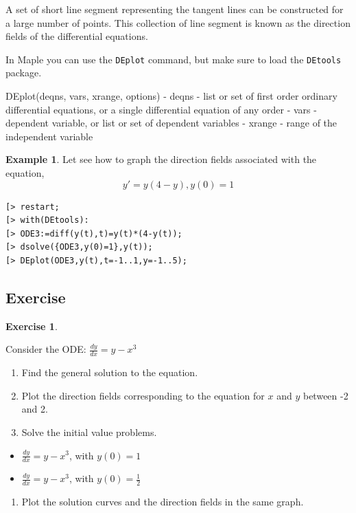 \documentclass[
]{book}
\providecommand{\tightlist}{%
  \setlength{\itemsep}{0pt}\setlength{\parskip}{0pt}}
\theoremstyle{definition}
\theoremstyle{definition}
\newtheorem{example}{Example}[chapter]
\theoremstyle{definition}
\newtheorem{exercise}{Exercise}[chapter]
\theoremstyle{definition}
\theoremstyle{remark}
\begin{document}
A set of short line segment representing the tangent lines can be constructed for a large number of points. This collection of line segment is known as the direction fields of the
differential equations.

In Maple you can use the \texttt{DEplot} command, but make sure to load the \texttt{DEtools} package.

DEplot(deqns, vars, xrange, options)
- deqns - list or set of first order ordinary differential equations, or a single differential
equation of any order
- vars - dependent variable, or list or set of dependent variables
- xrange - range of the independent variable

\begin{example}
\protect\hypertarget{exm:unnamed-chunk-39}{}\label{exm:unnamed-chunk-39}Let see how to graph the direction fields associated with the equation,
\[y' = y(4 − y), y(0) = 1\]
\end{example}

\begin{verbatim}
[> restart;
[> with(DEtools):
[> ODE3:=diff(y(t),t)=y(t)*(4-y(t));
[> dsolve({ODE3,y(0)=1},y(t));
[> DEplot(ODE3,y(t),t=-1..1,y=-1..5);
\end{verbatim}

\subsection{Exercise}\label{exercise-8}

\begin{exercise}
\protect\hypertarget{exr:unnamed-chunk-40}{}\label{exr:unnamed-chunk-40}

Consider the ODE: \(\frac{dy}{dx} = y - x^3\)

\begin{enumerate}
\def\labelenumi{(\alph{enumi})}
\tightlist
\item
  Find the general solution to the equation.
\item
  Plot the direction fields corresponding to the equation for \(x\) and \(y\) between -2 and 2.
\item
  Solve the initial value problems.
\end{enumerate}

\begin{itemize}
\tightlist
\item
  \(\frac{dy}{dx} = y - x^3\), with \(y(0) = {1}\)
\item
  \(\frac{dy}{dx} = y - x^3\), with \(y(0) = \frac{1}{2}\)
\end{itemize}

\begin{enumerate}
\def\labelenumi{(\alph{enumi})}
\setcounter{enumi}{3}
\tightlist
\item
  Plot the solution curves and the direction fields in the same graph.
\end{enumerate}

\end{exercise}
\end{document}
